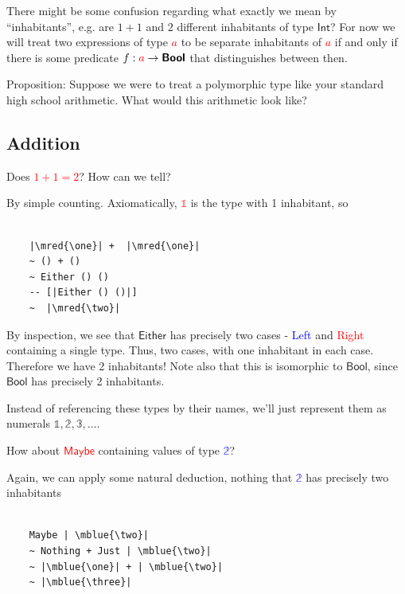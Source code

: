 \documentclass[tikz]{beamer}
\newcommand{\cat}[1]{\bm{ \mathsf{#1} }}
\newcommand{\one}{\bm{\mathbb{1}}}
\newcommand{\two}{\bm{\mathbb{2}}}
\newcommand{\three}{\bm{\mathbb{3}}}
\newcommand{\red}[1]{\textcolor{red}{#1}}
\newcommand{\mred}[1]{\textcolor{red}{$#1$}}
\newcommand{\blue}[1]{\textcolor{blue}{#1}}
\newcommand{\mblue}[1]{\textcolor{blue}{$#1$}}
\theoremstyle{definition}
\begin{document}
\frame
{
	There might be some confusion regarding what exactly we mean by “inhabitants”, e.g. are $1 + 1$ and $2$ different inhabitants of type $\cat{Int}$? For now we will treat two expressions of type \mred{a} to be separate inhabitants of \mred{a} if and only if there is some predicate $f : \red{a} \to \cat{Bool}$ that distinguishes between then. 
}

\frame
{ 
	Proposition: Suppose we were to treat a polymorphic type like your standard high school arithmetic. What would this arithmetic look like? 
}

\subsection{Addition}

\frame
{ 
	Does \mred{1 + 1 = 2}? How can we tell? 
}

\begin{frame}[fragile]
	By simple counting. Axiomatically, \mred{\one} is the type with 1 inhabitant, so
	\begin{verbatim}
	
	|\mred{\one}| +  |\mred{\one}|
	~ () + ()
	~ Either () ()
	-- [|Either () ()|]
	~  |\mred{\two}|
	\end{verbatim}
	
\end{frame}

\frame
{ 
	By inspection, we see that $\cat{Either}$ has precisely two cases - \blue{Left} and \red{Right} containing a single type. Thus, two cases, with one inhabitant in each case. Therefore we have 2 inhabitants! Note also that this is isomorphic to $\cat{Bool}$, since $\cat{Bool}$ has precisely 2 inhabitants. 
}

\frame
{
	Instead of referencing these types by their names, we'll just represent them as numerals $\one, \two, \three, \ldots$. 
}

\frame
{ 
	How about \mred{\cat{Maybe}} containing values of type \mblue{\two}? 
}

\begin{frame}[fragile]

Again, we can apply some natural deduction, nothing that  \mblue{\two} has precisely two inhabitants
	\begin{verbatim}
	
	Maybe | \mblue{\two}|
	~ Nothing + Just | \mblue{\two}|
	~ |\mblue{\one}| + | \mblue{\two}|
	~ |\mblue{\three}| 
	\end{verbatim}
\end{frame}
\end{document}
